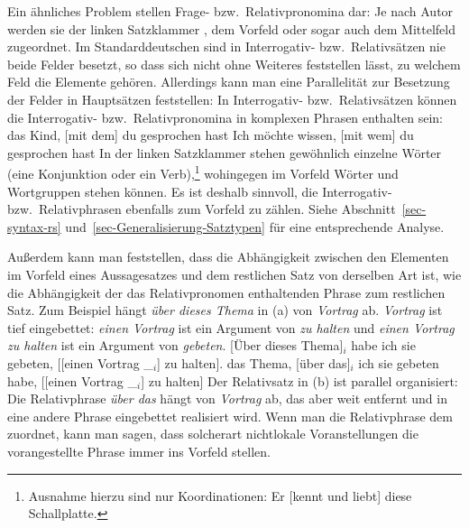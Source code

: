 Ein\label{Seite-Relativsätze-Interrogativnebensätze}
ähnliches Problem stellen Frage- bzw.\ Relativpronomina dar: Je nach Autor werden sie der linken
Satzklammer \parencites{Kathol2001a}[--95]{Duerscheid2003a-u}[]{Eisenberg2004a}[, 57, 69--70]{Pafel2011a-u}, dem Vorfeld
\parencites[§1345]{Duden2005-Authors}[--30, Abschnitt~3.1]{Woellstein2010a-u} oder sogar auch dem Mittelfeld
\citep[]{AH2004a-u} zugeordnet. Im 
Standarddeutschen sind in Interrogativ- bzw.\ Relativsätzen nie
beide Felder besetzt, so dass sich nicht ohne Weiteres feststellen lässt, zu welchem Feld die
Elemente gehören. Allerdings kann man eine Parallelität zur Besetzung der Felder in Hauptsätzen
feststellen: In Interrogativ- bzw.\ Relativsätzen können die Interrogativ- bzw.\ Relativpronomina in
komplexen Phrasen enthalten sein: 
\eal
\ex das Kind, [mit dem] du gesprochen hast
\ex Ich möchte wissen, [mit wem] du gesprochen hast
\zl
In der linken Satzklammer stehen gewöhnlich einzelne Wörter (eine Konjunktion oder ein Verb),\footnote{
  Ausnahme hierzu sind nur Koordinationen:
\ea
Er [kennt und liebt] diese Schallplatte.
\z
}
wohingegen im Vorfeld Wörter und Wortgruppen stehen können. Es ist deshalb sinnvoll, die
Interrogativ- bzw.\ Relativphrasen ebenfalls zum Vorfeld zu zählen. Siehe
Abschnitt~\ref{sec-syntax-rs} und~\ref{sec-Generalisierung-Satztypen} für eine
entsprechende Analyse.

Außerdem\label{page-Relativsätze-Topologie} kann man feststellen, dass die Abhängigkeit zwischen den Elementen im Vorfeld eines
Aussagesatzes und dem restlichen Satz von derselben Art ist, wie die Abhängigkeit der das
Relativpronomen enthaltenden Phrase zum restlichen Satz. Zum Beispiel hängt \emph{über dieses Thema} in (a)
von \emph{Vortrag} ab. \emph{Vortrag} ist tief eingebettet: \emph{einen Vortrag} ist ein Argument
von \emph{zu halten} und \emph{einen Vortrag zu halten} ist ein Argument von \emph{gebeten}.
\eal
\ex {}[Über dieses Thema]$_i$ habe ich sie gebeten, [[einen Vortrag \_$_i$] zu halten].
\ex das Thema, [über das]$_i$ ich sie gebeten habe, [[einen Vortrag \_$_i$] zu halten]
\zl
Der Relativsatz in (b) ist parallel organisiert: Die Relativphrase \emph{über das} hängt von
\emph{Vortrag} ab, das aber weit entfernt und in eine andere Phrase eingebettet realisiert
wird. Wenn man die Relativphrase dem \vf zuordnet, kann man sagen, dass solcherart nichtlokale
Voranstellungen die vorangestellte Phrase immer ins Vorfeld stellen.

